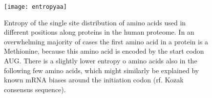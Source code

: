 \documentclass[superscriptaddress,twocolumn,pre]{revtex4}
\newcommand{\<}{\langle}
\renewcommand{\>}{\rangle}
\begin{document}


\begin{figure}
    \texttt{[image: entropyaa]}
    \caption{Entropy of the single site distribution of amino acids used in different positions along proteins in the human proteome. In an overwhelming majority of cases the first amino acid in a protein is a Methionine, because this amino acid is encoded by the start codon AUG. There is a slightly lower entropy o amino acids also in the following few amino acids, which might similarly be explained by known mRNA biases around the initiation codon (rf. Kozak consensus sequence). 
    \label{figentropyaa}
    }
\end{figure}
\end{document}
